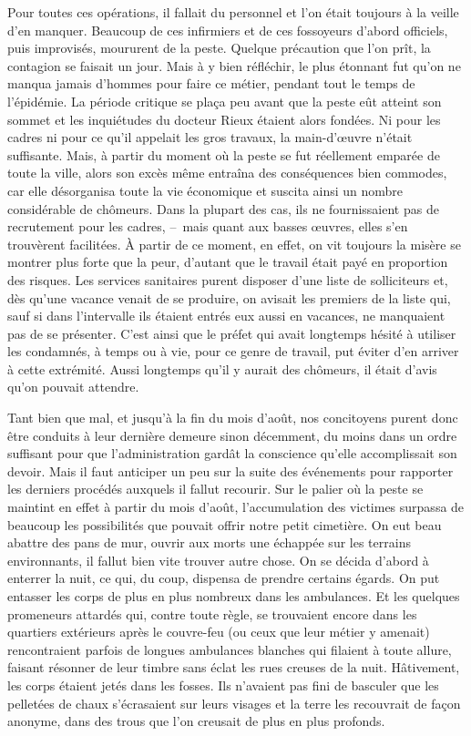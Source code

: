 \documentclass[french,twoside]{book} %
\begin{document}
Pour toutes ces opérations, il fallait du personnel et l’on était toujours à la veille d’en manquer. Beaucoup de ces infirmiers et de ces fossoyeurs d’abord officiels, puis improvisés, moururent de la peste. Quelque précaution que l’on prît, la contagion se faisait un jour. Mais à y bien réfléchir, le plus étonnant fut qu’on ne manqua jamais d’hommes pour faire ce métier, pendant tout le temps de l’épidémie. La période critique se plaça peu avant que la peste eût atteint son sommet et les inquiétudes du docteur Rieux étaient alors fondées. Ni pour les cadres ni pour ce qu’il appelait les gros travaux, la main-d’œuvre n’était suffisante. Mais, à partir du moment où la peste se fut réellement emparée de toute la ville, alors son excès même entraîna des conséquences bien commodes, car elle désorganisa toute la vie économique et suscita ainsi un nombre considérable de chômeurs. Dans la plupart des cas, ils ne fournissaient pas de recrutement pour les cadres, – mais quant aux basses œuvres, elles s’en trouvèrent facilitées. À partir de ce moment, en effet, on vit toujours la misère se montrer plus forte que la peur, d’autant que le travail était payé en proportion des risques. Les services sanitaires purent disposer d’une liste de solliciteurs et, dès qu’une vacance venait de se produire, on avisait les premiers de la liste qui, sauf si dans l’intervalle ils étaient entrés eux aussi en vacances, ne manquaient pas de se présenter. C’est ainsi que le préfet qui avait longtemps hésité à utiliser les condamnés, à temps ou à vie, pour ce genre de travail, put éviter d’en arriver à cette extrémité. Aussi longtemps qu’il y aurait des chômeurs, il était d’avis qu’on pouvait attendre.\par
Tant bien que mal, et jusqu’à la fin du mois d’août, nos concitoyens purent donc être conduits à leur dernière demeure sinon décemment, du moins dans un ordre suffisant pour que l’administration gardât la conscience qu’elle accomplissait son devoir. Mais il faut anticiper un peu sur la suite des événements pour rapporter les derniers procédés auxquels il fallut recourir. Sur le palier où la peste se maintint en effet à partir du mois d’août, l’accumulation des victimes surpassa de beaucoup les possibilités que pouvait offrir notre petit cimetière. On eut beau abattre des pans de mur, ouvrir aux morts une échappée sur les terrains environnants, il fallut bien vite trouver autre chose. On se décida d’abord à enterrer la nuit, ce qui, du coup, dispensa de prendre certains égards. On put entasser les corps de plus en plus nombreux dans les ambulances. Et les quelques promeneurs attardés qui, contre toute règle, se trouvaient encore dans les quartiers extérieurs après le couvre-feu (ou ceux que leur métier y amenait) rencontraient parfois de longues ambulances blanches qui filaient à toute allure, faisant résonner de leur timbre sans éclat les rues creuses de la nuit. Hâtivement, les corps étaient jetés dans les fosses. Ils n’avaient pas fini de basculer que les pelletées de chaux s’écrasaient sur leurs visages et la terre les recouvrait de façon anonyme, dans des trous que l’on creusait de plus en plus profonds.\par
\end{document}

